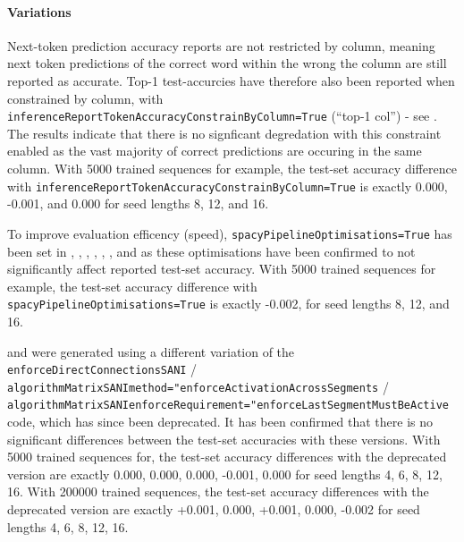 \paragraph{Variations}

Next-token prediction accuracy reports are not restricted by column, meaning next token predictions of the correct word within the wrong the column are still reported as accurate. Top-1 test-accurcies have therefore also been reported when constrained by column, with \texttt{inferenceReportTokenAccuracyConstrainByColumn=True} (``top-1 col'') - see . The results indicate that there is no signficant degredation with this constraint enabled as the vast majority of correct predictions are occuring in the same column. With 5000 trained sequences for example, the test-set accuracy difference with \texttt{inferenceReportTokenAccuracyConstrainByColumn=True} is exactly 0.000, -0.001, and 0.000 for seed lengths 8, 12, and 16.

To improve evaluation efficency (speed), \texttt{spacyPipelineOptimisations=True} has been set in , ,  , , , , and  as these optimisations have been confirmed to not significantly affect reported test-set accuracy. With 5000 trained sequences for example, the test-set accuracy difference with \texttt{spacyPipelineOptimisations=True} is exactly -0.002, for seed lengths 8, 12, and 16.

 and  were generated using a different variation of the \texttt{enforceDirectConnectionsSANI} / \texttt{algorithmMatrixSANImethod="enforceActivationAcrossSegments} / \texttt{algorithmMatrixSANIenforceRequirement="enforceLastSegmentMustBeActive} code, which has since been deprecated. It has been confirmed that there is no significant differences between the test-set accuracies with these versions. With 5000 trained sequences for, the test-set accuracy differences with the deprecated version are exactly 0.000, 0.000, 0.000, -0.001, 0.000 for seed lengths  4, 6, 8, 12, 16. With 200000 trained sequences, the test-set accuracy differences with the deprecated version are exactly +0.001, 0.000, +0.001, 0.000, -0.002 for seed lengths 4, 6, 8, 12, 16.

